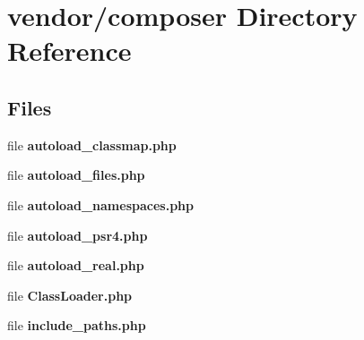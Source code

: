 \section{vendor/composer Directory Reference}
\label{dir_532a12997e259df44ef34d737d4233a6}
\subsection*{Files}
\begin{DoxyCompactItemize}
\item 
file {\bf autoload\+\_\+classmap.\+php}
\item 
file {\bf autoload\+\_\+files.\+php}
\item 
file {\bf autoload\+\_\+namespaces.\+php}
\item 
file {\bf autoload\+\_\+psr4.\+php}
\item 
file {\bf autoload\+\_\+real.\+php}
\item 
file {\bf Class\+Loader.\+php}
\item 
file {\bf include\+\_\+paths.\+php}
\end{DoxyCompactItemize}
